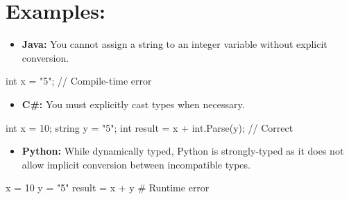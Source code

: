 \documentclass[
  letterpaper,
  DIV=11,
  numbers=noendperiod]{scrreprt}
\newenvironment{Shaded}{\begin{snugshade}}{\end{snugshade}}
\newcommand{\CommentTok}[1]{\textcolor[rgb]{0.37,0.37,0.37}{#1}}
\newcommand{\DataTypeTok}[1]{\textcolor[rgb]{0.68,0.00,0.00}{#1}}
\newcommand{\DecValTok}[1]{\textcolor[rgb]{0.68,0.00,0.00}{#1}}
\newcommand{\NormalTok}[1]{\textcolor[rgb]{0.00,0.23,0.31}{#1}}
\newcommand{\OperatorTok}[1]{\textcolor[rgb]{0.37,0.37,0.37}{#1}}
\newcommand{\StringTok}[1]{\textcolor[rgb]{0.13,0.47,0.30}{#1}}
\providecommand{\tightlist}{%
  \setlength{\itemsep}{0pt}\setlength{\parskip}{0pt}}
\begin{document}
\section{Examples:}

\begin{itemize}
\tightlist
\item
  \textbf{Java:} You cannot assign a string to an integer variable
  without explicit conversion.
\end{itemize}

\begin{Shaded}
\begin{Highlighting}[]
\DataTypeTok{int}\NormalTok{ x }\OperatorTok{=} \StringTok{"5"}\OperatorTok{;} \CommentTok{// Compile{-}time error}
\end{Highlighting}
\end{Shaded}

\begin{itemize}
\tightlist
\item
  \textbf{C\#:} You must explicitly cast types when necessary.
\end{itemize}

\begin{Shaded}
\begin{Highlighting}[]
\DataTypeTok{int}\NormalTok{ x }\OperatorTok{=} \DecValTok{10}\OperatorTok{;}
\NormalTok{string y }\OperatorTok{=} \StringTok{"5"}\OperatorTok{;}
\DataTypeTok{int}\NormalTok{ result }\OperatorTok{=}\NormalTok{ x }\OperatorTok{+} \DataTypeTok{int}\OperatorTok{.}\NormalTok{Parse}\OperatorTok{(}\NormalTok{y}\OperatorTok{);} \CommentTok{// Correct}
\end{Highlighting}
\end{Shaded}

\begin{itemize}
\tightlist
\item
  \textbf{Python:} While dynamically typed, Python is strongly-typed as
  it does not allow implicit conversion between incompatible types.
\end{itemize}

\begin{Shaded}
\begin{Highlighting}[]
\NormalTok{x }\OperatorTok{=} \DecValTok{10}
\NormalTok{y }\OperatorTok{=} \StringTok{"5"}
\NormalTok{result }\OperatorTok{=}\NormalTok{ x }\OperatorTok{+}\NormalTok{ y  }\CommentTok{\# Runtime error}
\end{Highlighting}
\end{Shaded}
\end{document}
